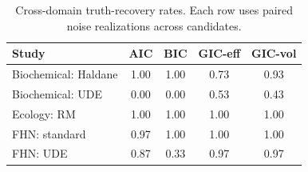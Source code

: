 \begin{table}[t]
\caption{Cross-domain truth-recovery rates. Each row uses paired noise realizations across candidates.}
\label{tab:crossdomain-recovery}
\centering
\begin{tabular}{lcccc}
\toprule
Study & AIC & BIC & GIC-eff & GIC-vol\\
\midrule
Biochemical: Haldane & 1.00 & 1.00 & 0.73 & 0.93\\
Biochemical: UDE & 0.00 & 0.00 & 0.53 & 0.43\\
Ecology: RM & 1.00 & 1.00 & 1.00 & 1.00\\
FHN: standard & 0.97 & 1.00 & 1.00 & 1.00\\
FHN: UDE & 0.87 & 0.33 & 0.97 & 0.97\\
\bottomrule
\end{tabular}
\end{table}
